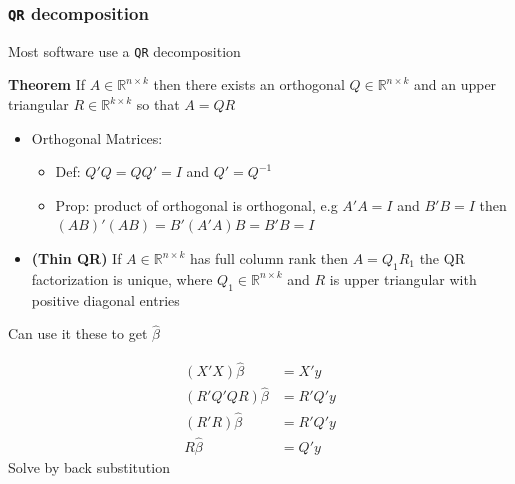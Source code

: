 \documentclass[
  shownotes,
  xcolor={svgnames},
  hyperref={colorlinks,citecolor=DarkBlue,linkcolor=DarkRed,urlcolor=DarkBlue}
  , aspectratio=169]{beamer}
\newenvironment{Shaded}{\begin{snugshade}}{\end{snugshade}}
\begin{document}
\begin{frame}[fragile]
\frametitle{\texttt{QR} decomposition}
Most software use a \texttt{QR} decomposition
 
 \begin{Shaded}
{\bf Theorem}
If $A\in\mathbb{R}^{n\times k}$ then there exists an orthogonal $Q\in \mathbb{R}^{n\times k}$ and an upper triangular $R\in \mathbb{R}^{k\times k}$ so that $A=QR$
\end{Shaded}

\begin{itemize}
  
  \footnotesize
  \item Orthogonal Matrices: 
  \begin{itemize}
    \tiny
  \item Def: $Q'Q=QQ'=I$ and $Q'=Q^{-1}$
  \item Prop: product of orthogonal is orthogonal, e.g $A'A=I$ and $B'B=I$ then $(AB)'(AB)=B'(A'A)B=B'B=I$
  \end{itemize}
  \item {\bf (Thin QR)} If $A\in\mathbb{R}^{n\times k}$   has full column rank then $A=Q_1R_1$ the QR factorization is unique, where $Q_1 \in\mathbb{R}^{n\times k}$ and $R$ is upper triangular with  positive diagonal entries
\end{itemize}

Can use it these to get $\hat \beta$

\footnotesize
\begin{align}
  (X'X) \hat \beta &=  X'y  \\
  (R'Q'QR) \hat \beta &=  R'Q'y  \\
  (R'R) \hat \beta &=  R'Q'y  \\
  R \hat \beta &=  Q'y  
\end{align}
Solve by back substitution

\end{frame}
\end{document}
